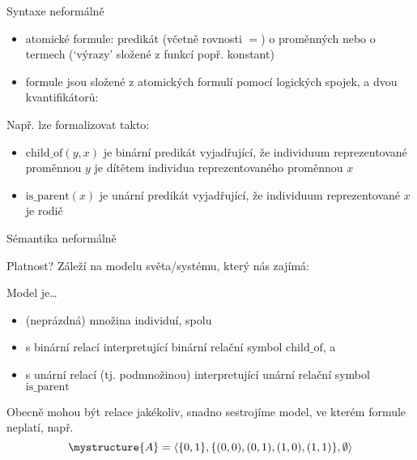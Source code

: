 \documentclass{beamer}
\begin{document}
\begin{frame}{Syntaxe neformálně}

    \begin{itemize}
        \item \alert{atomické formule}: predikát (včetně \alert{rovnosti} $=$) o proměnných nebo o \alert{termech} (`výrazy' složené z funkcí popř. konstant)\pause
        \item \alert{formule} jsou složené z atomických formulí pomocí logických spojek, a dvou \alert{kvantifikátorů}:\pause
    \end{itemize}  

    \medskip

    \bigskip

    Např.  lze formalizovat takto:
    \pause

    \begin{itemize}
        \item \alert{$\mathrm{child\_of}(y,x)$} je binární predikát vyjadřující, že individuum reprezentované proměnnou $y$ je dítětem individua reprezentovaného proměnnou $x$\pause
        \item \alert{$\mathrm{is\_parent}(x)$} je unární predikát vyjadřující, že individuum reprezentované $x$ je rodič
    \end{itemize}
    
\end{frame}


\begin{frame}{Sémantika neformálně}

    \pause

    Platnost? Záleží na \alert{modelu} světa/systému, který nás zajímá:\pause
    
    \alert{Model} je\dots\pause
    \begin{itemize}
        \item (neprázdná) množina individuí, spolu\pause
        \item s binární relací \alert{interpretující} binární relační symbol \alert{$\mathrm{child\_of}$}, a\pause
        \item s unární relací (tj. podmnožinou) interpretující unární relační symbol \alert{$\mathrm{is\_parent}$}\pause        
    \end{itemize}
    Obecně mohou být relace jakékoliv, snadno sestrojíme model, ve kterém formule neplatí, např. \pause
    $$
    \mystructure{A}=\langle\{0,1\},\{(0,0),(0,1),(1,0),(1,1)\},\emptyset\rangle
    $$

\end{frame}
\end{document}
